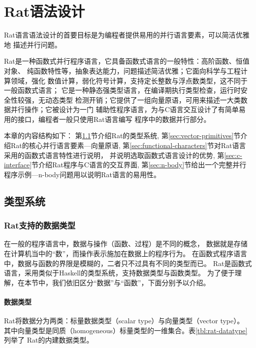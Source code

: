 \chapter{Rat语法设计}\label{chap:frontend}
Rat语言语法设计的首要目标是为编程者提供易用的并行语言要素，可以简洁优雅地
描述并行问题。

Rat是一种函数式并行程序语言，它具备函数式语言的一般特性：高阶函数、恒值对象、
纯函数特性等，抽象表达能力，问题描述简洁优雅；它面向科学与工程计算领域，强化
数值计算，弱化符号计算，支持定长整数与浮点数类型，这不同于一般函数式语言；
它是一种静态强类型语言，在编译期执行类型检查，运行时安全性较强，无动态类型
检测开销；它提供了一组向量原语，可用来描述一大类数据并行操作；它被设计为一门
辅助性程序语言，为与C语言交互设计了有简单易用的接口，编程者一般只使用Rat语言编写
程序中的数据并行部分。

本章的内容结构如下：
第\ref{sec:type-system}节介绍Rat的类型系统,
第\ref{sec:vector-primitives}节介绍Rat的核心并行语言要素---向量原语,
第\ref{sec:functional-characters}节对Rat语言采用的函数式语言特性进行说明，
并说明选取函数式语言设计的优势,
第\ref{sec:c-interface}节介绍Rat程序与C语言的交互界面,
第\ref{sec:n-body}节给出一个完整并行程序示例---n-body问题用以说明Rat语言的易用性。


\section{类型系统}\label{sec:type-system}
\subsection{Rat支持的数据类型}
在一般的程序语言中，数据与操作（函数、过程）是不同的概念，
数据就是存储在计算机当中的“数”，而操作表示施加在数据上的程序行为。
在函数式程序语言中，数据与函数的界限是模糊的，二者只不过具有不同的类型而已。
Rat是函数式语言，采用类似于Haskell的类型系统，支持数据类型与函数类型。
为了便于理解，在本节中，我们依旧区分“数据”与“函数”，下面分别予以介绍。

\subsubsection{数据类型}
Rat将数据分为两类：标量数据类型（scalar type）与向量类型（vector type）。
其中向量类型是同质（homogeneous）标量类型的一维集合。表\ref{tbl:rat-datatype}列举了
Rat的内建数据类型。

